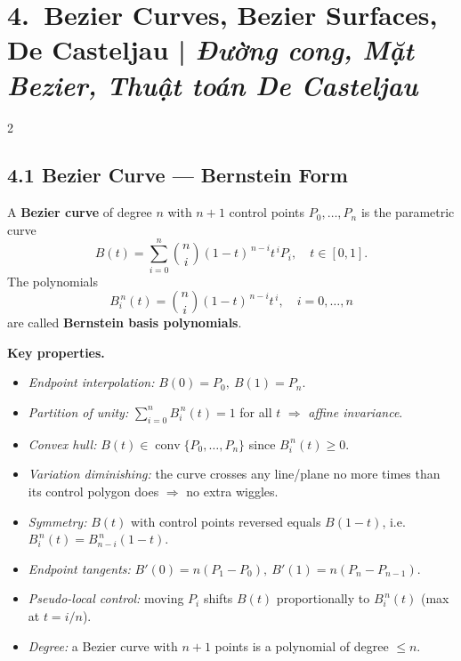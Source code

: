 
\section*{4.\ Bezier Curves, Bezier Surfaces, De Casteljau \;|\; \textit{Đường cong, Mặt Bezier, Thuật toán De Casteljau}}

\begin{paracol}{2}

\subsection*{4.1 Bezier Curve --- Bernstein Form}

A \textbf{Bezier curve} of degree $n$ with $n{+}1$ control points $P_0,\dots,P_n$ is the parametric curve
\[
B(t)=\sum_{i=0}^{n}\binom{n}{i}(1-t)^{\,n-i}t^{\,i}P_i,\quad t\in[0,1].
\]
The polynomials
\[
B_i^{\,n}(t)=\binom{n}{i}(1-t)^{\,n-i}t^{\,i},\quad i=0,\dots,n
\]
are called \textbf{Bernstein basis polynomials}.

\textbf{Key properties.}
\begin{itemize}[leftmargin=*,nosep]
  \item \emph{Endpoint interpolation:} $B(0)=P_0,\ B(1)=P_n$.
  \item \emph{Partition of unity:} $\sum_{i=0}^{n}B_i^{\,n}(t)=1$ for all $t$ $\Rightarrow$ \emph{affine invariance}.
  \item \emph{Convex hull:} $B(t)\in\operatorname{conv}\{P_0,\dots,P_n\}$ since $B_i^{\,n}(t)\ge 0$.
  \item \emph{Variation diminishing:} the curve crosses any line/plane no more times than its control polygon does $\Rightarrow$ no extra wiggles.
  \item \emph{Symmetry:} $B(t)$ with control points reversed equals $B(1{-}t)$, i.e.\ $B_i^{\,n}(t)=B_{n-i}^{\,n}(1-t)$.
  \item \emph{Endpoint tangents:}
        $B'(0)=n(P_1-P_0),\ B'(1)=n(P_n-P_{n-1})$.
  \item \emph{Pseudo-local control:} moving $P_i$ shifts $B(t)$ proportionally to $B_i^{\,n}(t)$ (max at $t=i/n$).
  \item \emph{Degree:} a Bezier curve with $n{+}1$ points is a polynomial of degree $\le n$.
\end{itemize}


\end{paracol}
